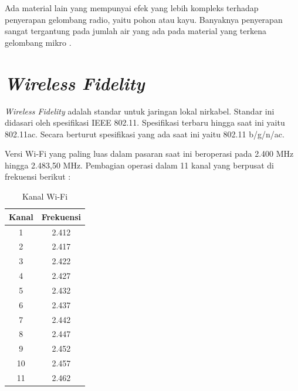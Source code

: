 \documentclass[12pt,a4paper]{report}
\begin{document}
		Ada material lain yang mempunyai efek yang lebih kompleks terhadap penyerapan gelombang radio, yaitu pohon atau kayu. Banyaknya penyerapan sangat tergantung pada jumlah air yang ada pada material yang terkena gelombang mikro \cite{Setiadi2013}.
		
		\section{\emph{Wireless Fidelity}}
		\emph{Wireless Fidelity} adalah standar untuk jaringan lokal nirkabel. Standar ini didasari oleh spesifikasi IEEE 802.11. Spesifikasi terbaru hingga saat ini yaitu 802.11ac. Secara berturut spesifikasi yang ada saat ini yaitu 802.11 b/g/n/ac.
		
		Versi Wi-Fi yang paling luas dalam pasaran saat ini beroperasi pada 2.400 MHz hingga 2.483,50 MHz. Pembagian operasi dalam 11 kanal yang berpusat di frekuensi berikut \cite{Kartika2010}:
		
		\begin{table}[h]
			\centering
			\begin{tabular}{|c|c|}
				\hline Kanal & Frekuensi \\ 
				\hline 1 & 2.412 \\ 
				\hline 2 & 2.417 \\ 
				\hline 3 & 2.422 \\ 
				\hline 4 & 2.427 \\ 
				\hline 5 & 2.432 \\ 
				\hline 6 & 2.437 \\ 
				\hline 7 & 2.442 \\ 
				\hline 8 & 2.447 \\ 
				\hline 9 & 2.452 \\ 
				\hline 10 & 2.457 \\ 
				\hline 11 & 2.462 \\ 
				\hline 
			\end{tabular} 
			\caption{Kanal Wi-Fi}
			\label{tab:kanal}
		\end{table}
		
\end{document}
